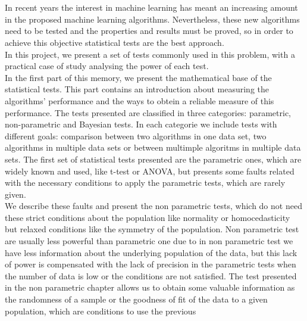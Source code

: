 \\

\vspace{0.7cm}
\\

	In recent years the interest in machine learning has 
meant an increasing amount in the proposed machine learning 
algorithms. Nevertheless, these new algorithms need to be 
tested and the properties and results must be proved, so in 
order to achieve this objective statistical tests are the 
best approach.\\
	In this project, we present a set of tests commonly used 
in this problem, with a practical case of study analysing the 
power of each test. \\
	In the first part of this memory, we present the 
mathematical base of the statistical tests. This part 
contains an introduction about measuring the algorithms’ 
performance and the ways to obtein a reliable measure of this 
performance. The tests presented are classified in three 
categories: parametric, non-parametric and Bayesian tests. In 
each categorie we include tests with different goals: 
comparison between two algorithms in one data set, two 
algorithms in multiple data sets or between multimple 
algoritms in multiple data sets. The first set of statistical 
tests presented are the parametric ones, which are widely 
known and used, like t-test or ANOVA, but presents some 
faults related with the necessary conditions to apply the 
parametric tests, which are rarely given. \\
	We describe these faults and present the non parametric 
tests, which do not need these strict conditions about the 
population like normality or homocedasticity but relaxed 
conditions like the symmetry of the population. Non 
parametric test are usually less powerful than parametric one 
due to in non parametric test we have less information about 
the underlying population of the data, but this lack of power 
is compensated with the lack of precision in the parametric 
tests when the number of data is low or the conditions are 
not satisfied. The test presented in the non parametric 
chapter allows us to obtain some valuable information as the 
randomness of a sample or the goodness of fit of the data to 
a given population, which are conditions to use the previous 
